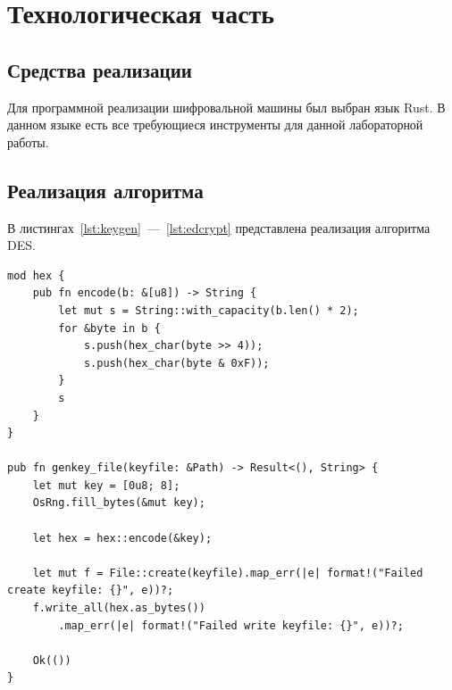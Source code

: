\chapter{Технологическая часть}

\section{Средства реализации}

Для программной реализации шифровальной машины был выбран язык Rust. В данном языке есть все требующиеся инструменты для данной лабораторной работы.

\section{Реализация алгоритма}

В листингах~\ref{lst:keygen}~---~\ref{lst:edcrypt} представлена реализация алгоритма DES.

\begin{center}
\captionsetup{justification=raggedright,singlelinecheck=off}
\begin{lstlisting}[label=lst:keygen,caption=Генерация ключа]
mod hex {
    pub fn encode(b: &[u8]) -> String {
        let mut s = String::with_capacity(b.len() * 2);
        for &byte in b {
            s.push(hex_char(byte >> 4));
            s.push(hex_char(byte & 0xF));
        }
        s
    }
}

pub fn genkey_file(keyfile: &Path) -> Result<(), String> {
    let mut key = [0u8; 8];
    OsRng.fill_bytes(&mut key);

    let hex = hex::encode(&key);

    let mut f = File::create(keyfile).map_err(|e| format!("Failed create keyfile: {}", e))?;
    f.write_all(hex.as_bytes())
        .map_err(|e| format!("Failed write keyfile: {}", e))?;

    Ok(())
}
\end{lstlisting}
\end{center}

